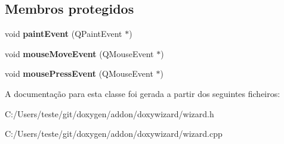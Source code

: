 \subsection*{Membros protegidos}
\begin{DoxyCompactItemize}
\item 
\hypertarget{class_color_picker_ad06d035e601c42cc2a3b9d1229c73d36}{void {\bfseries paint\-Event} (Q\-Paint\-Event $\ast$)}\label{class_color_picker_ad06d035e601c42cc2a3b9d1229c73d36}

\item 
\hypertarget{class_color_picker_a88e672693c2cfdbaf9af942a58a8e1dd}{void {\bfseries mouse\-Move\-Event} (Q\-Mouse\-Event $\ast$)}\label{class_color_picker_a88e672693c2cfdbaf9af942a58a8e1dd}

\item 
\hypertarget{class_color_picker_a991f0a076bd76a1ee5bda0df7fa474f4}{void {\bfseries mouse\-Press\-Event} (Q\-Mouse\-Event $\ast$)}\label{class_color_picker_a991f0a076bd76a1ee5bda0df7fa474f4}

\end{DoxyCompactItemize}


A documentação para esta classe foi gerada a partir dos seguintes ficheiros\-:\begin{DoxyCompactItemize}
\item 
C\-:/\-Users/teste/git/doxygen/addon/doxywizard/wizard.\-h\item 
C\-:/\-Users/teste/git/doxygen/addon/doxywizard/wizard.\-cpp\end{DoxyCompactItemize}
